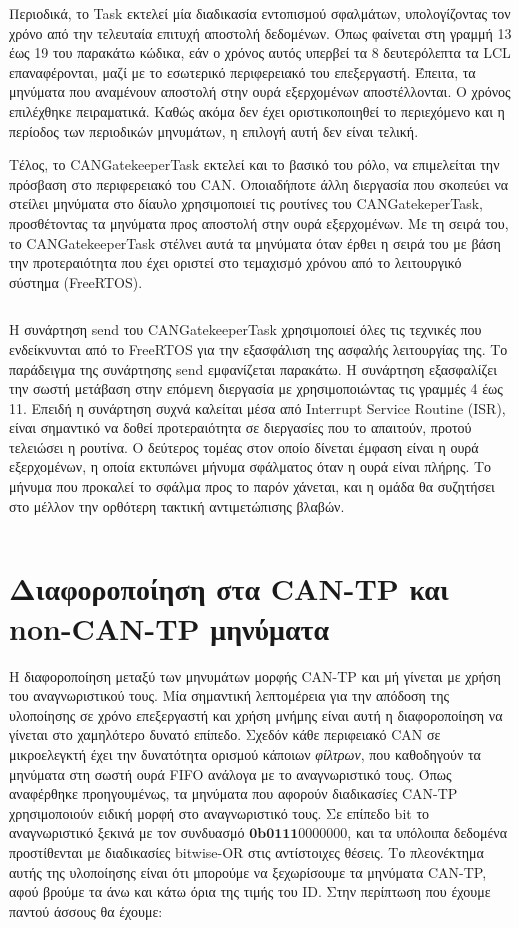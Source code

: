 \documentclass[a4paper,nobib,justified]{tufte-book}
\begin{document}
\par Περιοδικά, το Task εκτελεί μία διαδικασία εντοπισμού σφαλμάτων, υπολογίζοντας τον χρόνο από την τελευταία επιτυχή αποστολή δεδομένων. Όπως φαίνεται στη γραμμή 13 έως 19 του παρακάτω κώδικα, εάν ο χρόνος αυτός υπερβεί τα 8 δευτερόλεπτα τα LCL επαναφέρονται, μαζί με το εσωτερικό περιφερειακό του επεξεργαστή. Έπειτα, τα μηνύματα που αναμένουν αποστολή στην ουρά εξερχομένων αποστέλλονται. Ο χρόνος επιλέχθηκε πειραματικά. Καθώς ακόμα δεν έχει οριστικοποιηθεί το περιεχόμενο και η περίοδος των περιοδικών μηνυμάτων, η επιλογή αυτή δεν είναι τελική.

\par Τέλος, το CANGatekeeperTask εκτελεί και το βασικό του ρόλο, να επιμελείται την πρόσβαση στο περιφερειακό του CAN. Οποιαδήποτε άλλη διεργασία που σκοπεύει να στείλει μηνύματα στο δίαυλο χρησιμοποιεί τις ρουτίνες του CANGatekeperTask, προσθέτοντας τα μηνύματα προς αποστολή στην ουρά εξερχομένων. Με τη σειρά του, το CANGatekeeperTask στέλνει αυτά τα μηνύματα όταν έρθει η σειρά του με βάση την προτεραιότητα που έχει οριστεί στο τεμαχισμό χρόνου από το λειτουργικό σύστημα (FreeRTOS).
\inputminted{c++}{code/examples/gatekeeper-execute.cpp}

Η συνάρτηση send\(\) του CANGatekeeperTask χρησιμοποιεί όλες τις τεχνικές που ενδείκνυνται από το FreeRTOS για την εξασφάλιση της ασφαλής λειτουργίας της. Το παράδειγμα της συνάρτησης send εμφανίζεται παρακάτω. Η συνάρτηση εξασφαλίζει την σωστή μετάβαση στην επόμενη διεργασία με χρησιμοποιώντας τις γραμμές 4 έως 11. Επειδή η συνάρτηση συχνά καλείται μέσα από Interrupt Service Routine (ISR), είναι σημαντικό να δοθεί προτεραιότητα σε διεργασίες που το απαιτούν, προτού τελειώσει η ρουτίνα. Ο δεύτερος τομέας στον οποίο δίνεται έμφαση είναι η ουρά εξερχομένων, η οποία εκτυπώνει μήνυμα σφάλματος όταν η ουρά είναι πλήρης. Το μήνυμα που προκαλεί το σφάλμα προς το παρόν χάνεται, και η ομάδα θα συζητήσει στο μέλλον την ορθότερη τακτική αντιμετώπισης βλαβών. 
\inputminted{c++}{code/examples/gatekeeper-send.cpp}

\section{Διαφοροποίηση στα CAN-TP και non-CAN-TP μηνύματα}

Η διαφοροποίηση μεταξύ των μηνυμάτων μορφής CAN-TP και μή γίνεται με χρήση του αναγνωριστικού τους. Μία σημαντική λεπτομέρεια για την απόδοση της υλοποίησης σε χρόνο επεξεργαστή και χρήση μνήμης είναι αυτή η διαφοροποίηση να γίνεται στο χαμηλότερο δυνατό επίπεδο. Σχεδόν κάθε περιφειακό CAN σε μικροελεγκτή έχει την δυνατότητα ορισμού κάποιων \textit{φίλτρων}, που καθοδηγούν τα μηνύματα στη σωστή ουρά FIFO ανάλογα με το αναγνωριστικό τους. Όπως αναφέρθηκε προηγουμένως, τα μηνύματα που αφορούν διαδικασίες CAN-TP χρησιμοποιούν ειδική μορφή στο αναγνωριστικό τους. Σε επίπεδο bit το αναγνωριστικό ξεκινά με τον συνδυασμό $\textbf{0b0111}0000000$, και τα υπόλοιπα δεδομένα προστίθενται με διαδικασίες bitwise-OR στις αντίστοιχες θέσεις. Το πλεονέκτημα αυτής της υλοποίησης είναι ότι μπορούμε να ξεχωρίσουμε τα μηνύματα CAN-TP, αφού βρούμε τα άνω και κάτω όρια της τιμής του ID. Στην περίπτωση που έχουμε παντού άσσους θα έχουμε:
\end{document}
